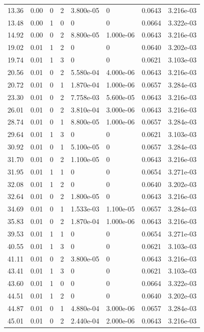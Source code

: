 \documentclass[preview]{standalone}
\begin{document}
{{\begin{tabular}{L{1.2cm}C{1.2cm} C{0.3cm}C{0.5cm} C{1.4cm}C{1.4cm} C{1.4cm}C{1.4cm}}
  13.36  &  0.00  & 0     &  2 &  3.800e-05  & 0  & 0.0643 &  3.216e-03   \\ 
  13.48  &  0.00  & 1     &  0 &  0  & 0  & 0.0664 &  3.322e-03   \\ 
  14.92  &  0.00  & 0     &  2 &  8.800e-05  & 1.000e-06  & 0.0643 &  3.216e-03   \\ 
  19.02  &  0.01  & 1     &  2 &  0  & 0  & 0.0640 &  3.202e-03   \\ 
  19.74  &  0.01  & 1     &  3 &  0  & 0  & 0.0621 &  3.103e-03   \\ 
  20.56  &  0.01  & 0     &  2 &  5.580e-04  & 4.000e-06  & 0.0643 &  3.216e-03   \\ 
  20.72  &  0.01  & 0     &  1 &  1.870e-04  & 1.000e-06  & 0.0657 &  3.284e-03   \\ 
  23.30  &  0.01  & 0     &  2 &  7.758e-03  & 5.600e-05  & 0.0643 &  3.216e-03   \\ 
  26.01  &  0.01  & 0     &  2 &  3.810e-04  & 3.000e-06  & 0.0643 &  3.216e-03   \\ 
  28.74  &  0.01  & 0     &  1 &  8.800e-05  & 1.000e-06  & 0.0657 &  3.284e-03   \\ 
  29.64  &  0.01  & 1     &  3 &  0  & 0  & 0.0621 &  3.103e-03   \\ 
  30.92  &  0.01  & 0     &  1 &  5.100e-05  & 0  & 0.0657 &  3.284e-03   \\ 
  31.70  &  0.01  & 0     &  2 &  1.100e-05  & 0  & 0.0643 &  3.216e-03   \\ 
  31.95  &  0.01  & 1     &  1 &  0  & 0  & 0.0654 &  3.271e-03   \\ 
  32.08  &  0.01  & 1     &  2 &  0  & 0  & 0.0640 &  3.202e-03   \\ 
  32.64  &  0.01  & 0     &  2 &  1.800e-05  & 0  & 0.0643 &  3.216e-03   \\ 
  34.69  &  0.01  & 0     &  1 &  1.533e-03  & 1.100e-05  & 0.0657 &  3.284e-03   \\ 
  35.83  &  0.01  & 0     &  2 &  1.870e-04  & 1.000e-06  & 0.0643 &  3.216e-03   \\ 
  39.53  &  0.01  & 1     &  1 &  0  & 0  & 0.0654 &  3.271e-03   \\ 
  40.55  &  0.01  & 1     &  3 &  0  & 0  & 0.0621 &  3.103e-03   \\ 
  41.11  &  0.01  & 0     &  2 &  3.800e-05  & 0  & 0.0643 &  3.216e-03   \\ 
  43.41  &  0.01  & 1     &  3 &  0  & 0  & 0.0621 &  3.103e-03   \\ 
  43.60  &  0.01  & 1     &  0 &  0  & 0  & 0.0664 &  3.322e-03   \\ 
  44.51  &  0.01  & 1     &  2 &  0  & 0  & 0.0640 &  3.202e-03   \\ 
  44.87  &  0.01  & 0     &  1 &  4.880e-04  & 3.000e-06  & 0.0657 &  3.284e-03   \\ 
  45.01  &  0.01  & 0     &  2 &  2.440e-04  & 2.000e-06  & 0.0643 &  3.216e-03   \\ 
\hline 
\end{tabular} 

}}
\end{document}
